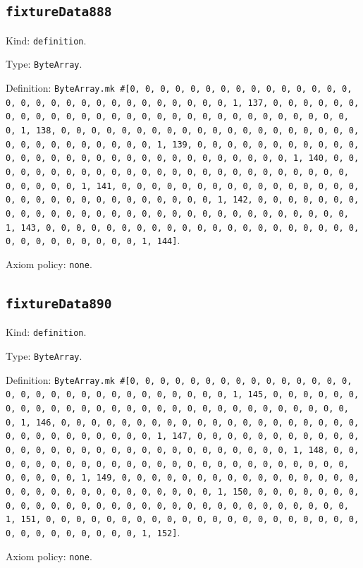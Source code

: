 \documentclass[11pt]{article}
\begin{document}
\subsection*{\texttt{fixtureData888}}
\noindent Kind: \texttt{definition}.\par
\noindent Type: \texttt{ByteArray}.\par
\noindent Definition: \texttt{ByteArray.mk \#[0, 0, 0, 0, 0, 0, 0, 0, 0, 0, 0, 0, 0, 0, 0, 0, 0, 0, 0, 0, 0, 0, 0, 0, 0, 0, 0, 0, 0, 0, 1, 137, 0, 0, 0, 0, 0, 0, 0, 0, 0, 0, 0, 0, 0, 0, 0, 0, 0, 0, 0, 0, 0, 0, 0, 0, 0, 0, 0, 0, 0, 0, 1, 138, 0, 0, 0, 0, 0, 0, 0, 0, 0, 0, 0, 0, 0, 0, 0, 0, 0, 0, 0, 0, 0, 0, 0, 0, 0, 0, 0, 0, 0, 0, 1, 139, 0, 0, 0, 0, 0, 0, 0, 0, 0, 0, 0, 0, 0, 0, 0, 0, 0, 0, 0, 0, 0, 0, 0, 0, 0, 0, 0, 0, 0, 0, 1, 140, 0, 0, 0, 0, 0, 0, 0, 0, 0, 0, 0, 0, 0, 0, 0, 0, 0, 0, 0, 0, 0, 0, 0, 0, 0, 0, 0, 0, 0, 0, 1, 141, 0, 0, 0, 0, 0, 0, 0, 0, 0, 0, 0, 0, 0, 0, 0, 0, 0, 0, 0, 0, 0, 0, 0, 0, 0, 0, 0, 0, 0, 0, 1, 142, 0, 0, 0, 0, 0, 0, 0, 0, 0, 0, 0, 0, 0, 0, 0, 0, 0, 0, 0, 0, 0, 0, 0, 0, 0, 0, 0, 0, 0, 0, 1, 143, 0, 0, 0, 0, 0, 0, 0, 0, 0, 0, 0, 0, 0, 0, 0, 0, 0, 0, 0, 0, 0, 0, 0, 0, 0, 0, 0, 0, 0, 0, 1, 144]}.\par
\noindent Axiom policy: \texttt{none}.\par
\subsection*{\texttt{fixtureData890}}
\noindent Kind: \texttt{definition}.\par
\noindent Type: \texttt{ByteArray}.\par
\noindent Definition: \texttt{ByteArray.mk \#[0, 0, 0, 0, 0, 0, 0, 0, 0, 0, 0, 0, 0, 0, 0, 0, 0, 0, 0, 0, 0, 0, 0, 0, 0, 0, 0, 0, 0, 0, 1, 145, 0, 0, 0, 0, 0, 0, 0, 0, 0, 0, 0, 0, 0, 0, 0, 0, 0, 0, 0, 0, 0, 0, 0, 0, 0, 0, 0, 0, 0, 0, 1, 146, 0, 0, 0, 0, 0, 0, 0, 0, 0, 0, 0, 0, 0, 0, 0, 0, 0, 0, 0, 0, 0, 0, 0, 0, 0, 0, 0, 0, 0, 0, 1, 147, 0, 0, 0, 0, 0, 0, 0, 0, 0, 0, 0, 0, 0, 0, 0, 0, 0, 0, 0, 0, 0, 0, 0, 0, 0, 0, 0, 0, 0, 0, 1, 148, 0, 0, 0, 0, 0, 0, 0, 0, 0, 0, 0, 0, 0, 0, 0, 0, 0, 0, 0, 0, 0, 0, 0, 0, 0, 0, 0, 0, 0, 0, 1, 149, 0, 0, 0, 0, 0, 0, 0, 0, 0, 0, 0, 0, 0, 0, 0, 0, 0, 0, 0, 0, 0, 0, 0, 0, 0, 0, 0, 0, 0, 0, 1, 150, 0, 0, 0, 0, 0, 0, 0, 0, 0, 0, 0, 0, 0, 0, 0, 0, 0, 0, 0, 0, 0, 0, 0, 0, 0, 0, 0, 0, 0, 0, 1, 151, 0, 0, 0, 0, 0, 0, 0, 0, 0, 0, 0, 0, 0, 0, 0, 0, 0, 0, 0, 0, 0, 0, 0, 0, 0, 0, 0, 0, 0, 0, 1, 152]}.\par
\noindent Axiom policy: \texttt{none}.\par
\end{document}

